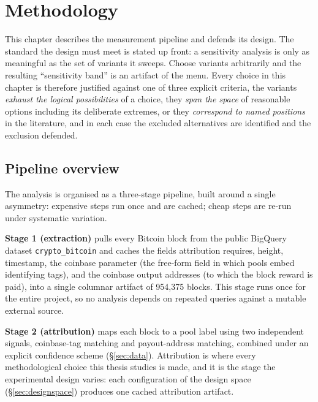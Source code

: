 \documentclass[logo,msc]{infthesis}           %
\begin{document}
\chapter{Methodology}
\label{ch:method}
 
This chapter describes the measurement pipeline and defends its design. The
standard the design must meet is stated up front: a sensitivity analysis is only
as meaningful as the set of variants it sweeps. Choose variants arbitrarily and
the resulting ``sensitivity band'' is an artifact of the menu. Every choice in
this chapter is therefore justified against one of three explicit criteria,
the variants \emph{exhaust the logical possibilities} of a choice, they
\emph{span the space} of reasonable options including its deliberate extremes,
or they \emph{correspond to named positions} in the literature, and in each
case the excluded alternatives are identified and the exclusion defended.
 
\section{Pipeline overview}
\label{sec:pipeline}
 
The analysis is organised as a three-stage pipeline, built around a single
asymmetry: expensive steps run once and are cached; cheap steps are re-run
under systematic variation.
 
\textbf{Stage 1 (extraction)} pulls every Bitcoin block from the public
BigQuery dataset \texttt{crypto\_bitcoin} and caches the fields attribution
requires, height, timestamp, the coinbase parameter (the free-form field in
which pools embed identifying tags), and the coinbase output addresses (to
which the block reward is paid), into a single columnar artifact of
954{,}375 blocks. This stage runs once for the entire project, so no analysis
depends on repeated queries against a mutable external source.
 
\textbf{Stage 2 (attribution)} maps each block to a pool label using two
independent signals, coinbase-tag matching and payout-address matching,
combined under an explicit confidence scheme (\S\ref{sec:data}). Attribution is
where every methodological choice this thesis studies is made, and it is the
stage the experimental design varies: each configuration of the design space
(\S\ref{sec:designspace}) produces one cached attribution artifact.
 
\end{document}
